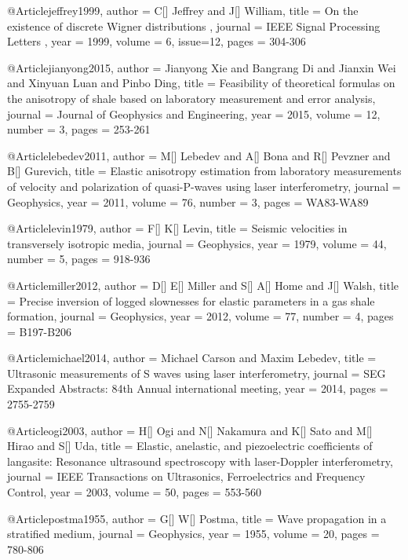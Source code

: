 @Article{jeffrey1999,
  author = 	 {C[] Jeffrey and J[] William},
  title = 	 { On the existence of discrete Wigner distributions },
  journal = 	 { IEEE Signal Processing Letters },
  year = 	 1999,
  volume = 	 6,
  issue=12,
  pages = 	 {304-306}
}

@Article{jianyong2015,
  author = 	 {Jianyong Xie and Bangrang Di and Jianxin Wei and Xinyuan Luan and Pinbo Ding},
  title = 	 {Feasibility of theoretical formulas on the anisotropy of shale based on laboratory measurement and error analysis},
  journal = 	 {Journal of Geophysics and Engineering},
  year = 	 2015,
  volume = 	 12,
  number = 	 3,
  pages = 	 {253-261}}

@Article{lebedev2011,
  author = 	 {M[] Lebedev and A[] Bona and R[] Pevzner and B[] Gurevich},
  title = 	 {Elastic anisotropy estimation from laboratory measurements of velocity and polarization of quasi-P-waves using laser interferometry},
  journal = 	 {Geophysics},
  year = 	 2011,
  volume = 	 76,
  number = 	 3,
  pages = 	 {WA83-WA89}}

@Article{levin1979,
  author = 	 {F[] K[] Levin},
  title = 	 {Seismic velocities in transversely isotropic media},
  journal = 	 {Geophysics},
  year = 	 1979,
  volume = 	 44,
  number = 	 5,
  pages = 	 {918-936}}

@Article{miller2012,
  author = 	 {D[] E[] Miller and S[] A[] Home and J[] Walsh},
  title = 	 {Precise inversion of logged slownesses for elastic parameters in a gas shale formation},
  journal = 	 {Geophysics},
  year = 	 2012,
  volume = 	 77,
  number = 	 4,
  pages = 	 {B197-B206}}

@Article{michael2014,
  author = 	 {Michael Carson and Maxim Lebedev},
  title = 	 {Ultrasonic measurements of S waves using laser interferometry},
  journal = 	 {SEG Expanded Abstracts: 84th Annual international meeting},
  year = 	 2014,
  pages = 	 {2755-2759}}

@Article{ogi2003,
  author = 	 {H[] Ogi and N[] Nakamura and K[] Sato and M[] Hirao and S[] Uda},
  title = 	 {Elastic, anelastic, and piezoelectric coefficients of langasite: Resonance ultrasound spectroscopy with laser-Doppler interferometry},
  journal = 	 {IEEE Transactions on Ultrasonics, Ferroelectrics and Frequency Control},
  year = 	 2003,
  volume = 	 50,
  pages = 	 {553-560}}

@Article{postma1955,
  author = 	 {G[] W[] Postma},
  title = 	 {Wave propagation in a stratified medium},
  journal = 	 {Geophysics},
  year = 	 1955,
  volume = 	 20,
  pages = 	 {780-806}}

